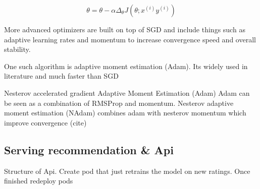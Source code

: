 \begin{equation}
    \theta = \theta - \alpha \Delta_{\theta} J(\theta ;x^{(i)}y^{(i)})
\end{equation}

More advanced optimizers are built on top of SGD and include things such as adaptive learning rates and momentum to increase convergence speed and overall stability.

One such algorithm is adaptive moment estimation (Adam). Its widely used in literature and much faster than SGD

Nesterov accelerated gradient
Adaptive Moment Estimation (Adam) 
Adam can be seen as a combination of RMSProp and momentum. \citet{Adam}
Nesterov adaptive moment estimation (NAdam) combines adam with nesterov momentum which improve convergence (cite)

\subsection{Serving recommendation \& Api}
Structure of Api.
Create pod that just retrains the model on new ratings. Once finished redeploy pods